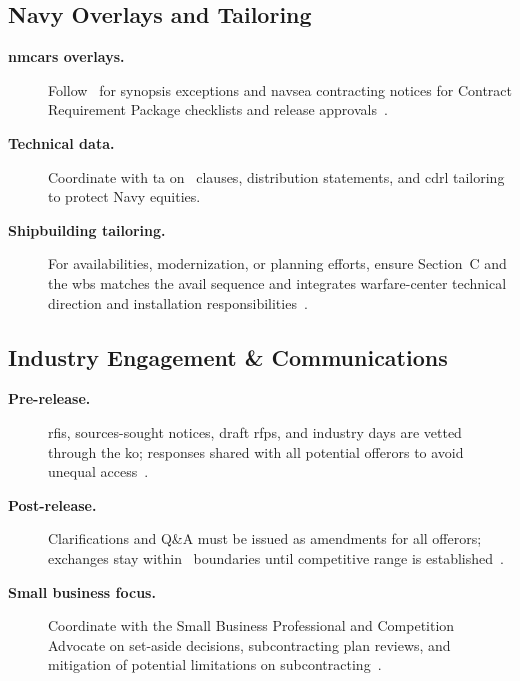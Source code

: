 \documentclass[../main.tex]{subfiles}
\begin{document}
\subsection{Navy Overlays and Tailoring}
\begin{description}
	\item[\textbf{\ac{nmcars} overlays.}] Follow~\autocite[\S~5205.303/5205.301]{NMCARS} for synopsis exceptions and \ac{navsea} contracting notices for Contract Requirement Package checklists and release approvals~\autocite{NMCARS,NAVSEA-Contracts-Handbook-2023}.
	\item[\textbf{Technical data.}] Coordinate with \ac{ta} on~\autocite[\S~252.227]{DFARS} clauses, distribution statements, and \ac{cdrl} tailoring to protect Navy equities.
	\item[\textbf{Shipbuilding tailoring.}] For availabilities, modernization, or planning efforts, ensure Section~C and the \ac{wbs} matches the avail sequence and integrates warfare-center technical direction and installation responsibilities~\autocite{edo-3-2-2-solicitation-prep-2025}.
\end{description}

\subsection{Industry Engagement \& Communications}
\begin{description}
	\item[\textbf{Pre-release.}] \acp{rfi}, sources-sought notices, draft \acp{rfp}, and industry days are vetted through the \ac{ko}; responses shared with all potential offerors to avoid unequal access~\autocite{FAR}.
	\item[\textbf{Post-release.}] Clarifications and Q\&A must be issued as amendments for all offerors; exchanges stay within~\autocite[\S~15.201]{FAR} boundaries until competitive range is established~\autocite{NAVSEA-Contracts-Handbook-2023}.
	\item[\textbf{Small business focus.}] Coordinate with the Small Business Professional and Competition Advocate on set-aside decisions, subcontracting plan reviews, and mitigation of potential limitations on subcontracting~\autocite{FAR}.
\end{description}
\end{document}
